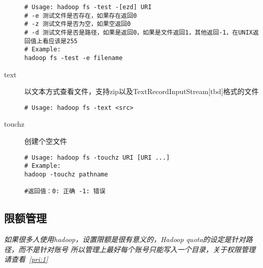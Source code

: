 \documentclass{article}
\begin{document}
\begin{description}
\begin{verbatim}
# Usage: hadoop fs -test -[ezd] URI
# -e 测试文件是否存在，如果存在返回0
# -z 测试文件是否为空，如果空返回0
# -d 测试文件是否是路径，如果是返回0，如果是文件返回1，其他返回-1，在UNIX返回值上看应该是255
# Example:
hadoop fs -test -e filename

\end{verbatim}

\item[text] 以文本方式查看文件，支持zip以及TextRecordInputStream[tbd]格式的文件

\begin{verbatim}
# Usage: hadoop fs -text <src>

\end{verbatim}

\item[touchz] 创建个空文件

\begin{verbatim}
# Usage: hadoop fs -touchz URI [URI ...]
# Example:
hadoop -touchz pathname

#返回值：0: 正确 -1: 错误
\end{verbatim}
\end{description}

\subsection{限额管理}
\textit{
如果很多人使用hadoop，设置限额是很有意义的，Hadoop quota的设定是针对路径，而不是针对账号
所以管理上最好每个账号只能写入一个目录，关于权限管理请查看~\ref{pri:1}
}
\end{document}

